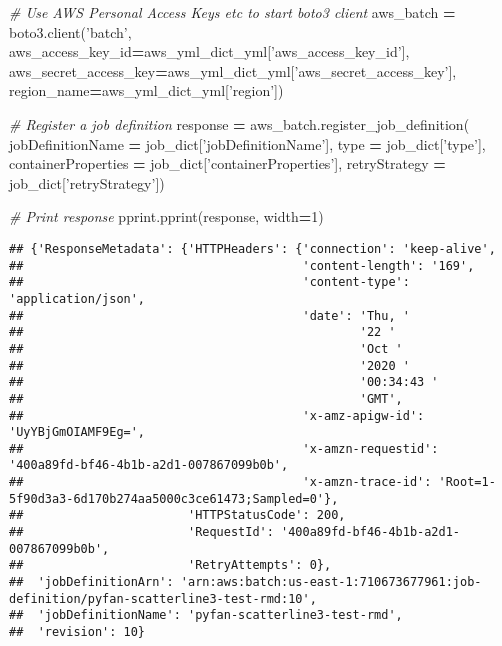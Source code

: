 \documentclass[
]{book}
\newenvironment{Shaded}{\begin{snugshade}}{\end{snugshade}}
\newcommand{\BuiltInTok}[1]{#1}
\newcommand{\CommentTok}[1]{\textcolor[rgb]{0.56,0.35,0.01}{\textit{#1}}}
\newcommand{\DecValTok}[1]{\textcolor[rgb]{0.00,0.00,0.81}{#1}}
\newcommand{\NormalTok}[1]{#1}
\newcommand{\OperatorTok}[1]{\textcolor[rgb]{0.81,0.36,0.00}{\textbf{#1}}}
\newcommand{\StringTok}[1]{\textcolor[rgb]{0.31,0.60,0.02}{#1}}
\begin{document}
\begin{Shaded}
\begin{Highlighting}[]
\CommentTok{# Use AWS Personal Access Keys etc to start boto3 client}
\NormalTok{aws_batch }\OperatorTok{=}\NormalTok{ boto3.client(}\StringTok{'batch'}\NormalTok{,}
\NormalTok{  aws_access_key_id}\OperatorTok{=}\NormalTok{aws_yml_dict_yml[}\StringTok{'aws_access_key_id'}\NormalTok{],}
\NormalTok{  aws_secret_access_key}\OperatorTok{=}\NormalTok{aws_yml_dict_yml[}\StringTok{'aws_secret_access_key'}\NormalTok{],}
\NormalTok{  region_name}\OperatorTok{=}\NormalTok{aws_yml_dict_yml[}\StringTok{'region'}\NormalTok{])}

\CommentTok{# Register a job definition}
\NormalTok{response }\OperatorTok{=}\NormalTok{ aws_batch.register_job_definition(}
\NormalTok{        jobDefinitionName }\OperatorTok{=}\NormalTok{ job_dict[}\StringTok{'jobDefinitionName'}\NormalTok{],}
        \BuiltInTok{type} \OperatorTok{=}\NormalTok{ job_dict[}\StringTok{'type'}\NormalTok{],}
\NormalTok{        containerProperties }\OperatorTok{=}\NormalTok{ job_dict[}\StringTok{'containerProperties'}\NormalTok{],}
\NormalTok{        retryStrategy }\OperatorTok{=}\NormalTok{ job_dict[}\StringTok{'retryStrategy'}\NormalTok{])}

\CommentTok{# Print response}
\NormalTok{pprint.pprint(response, width}\OperatorTok{=}\DecValTok{1}\NormalTok{)}
\end{Highlighting}
\end{Shaded}

\begin{verbatim}
## {'ResponseMetadata': {'HTTPHeaders': {'connection': 'keep-alive',
##                                       'content-length': '169',
##                                       'content-type': 'application/json',
##                                       'date': 'Thu, '
##                                               '22 '
##                                               'Oct '
##                                               '2020 '
##                                               '00:34:43 '
##                                               'GMT',
##                                       'x-amz-apigw-id': 'UyYBjGmOIAMF9Eg=',
##                                       'x-amzn-requestid': '400a89fd-bf46-4b1b-a2d1-007867099b0b',
##                                       'x-amzn-trace-id': 'Root=1-5f90d3a3-6d170b274aa5000c3ce61473;Sampled=0'},
##                       'HTTPStatusCode': 200,
##                       'RequestId': '400a89fd-bf46-4b1b-a2d1-007867099b0b',
##                       'RetryAttempts': 0},
##  'jobDefinitionArn': 'arn:aws:batch:us-east-1:710673677961:job-definition/pyfan-scatterline3-test-rmd:10',
##  'jobDefinitionName': 'pyfan-scatterline3-test-rmd',
##  'revision': 10}
\end{verbatim}
\end{document}
